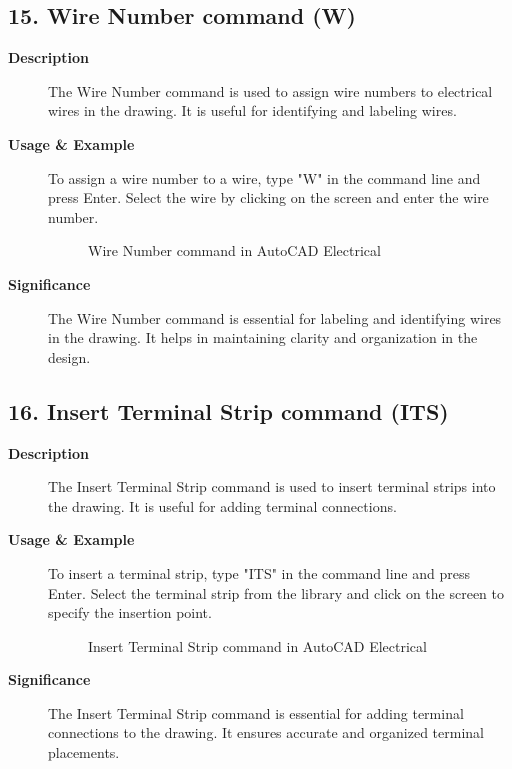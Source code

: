 \documentclass[12pt]{article}
\begin{document}
\subsection*{15. Wire Number command (W)}
\begin{description}
    \item [\textbf{Description}] The Wire Number command is used to assign wire numbers to electrical wires in the drawing. It is useful for identifying and labeling wires.
    \item [\textbf{Usage \& Example}]To assign a wire number to a wire, type "W" in the command line and press Enter. Select the wire by clicking on the screen and enter the wire number.
          \begin{figure}[H]
              \centering
              \caption{Wire Number command in AutoCAD Electrical}
          \end{figure}
    \item [\textbf{Significance}] The Wire Number command is essential for labeling and identifying wires in the drawing. It helps in maintaining clarity and organization in the design.
\end{description}

\subsection*{16. Insert Terminal Strip command (ITS)}
\begin{description}
    \item [\textbf{Description}] The Insert Terminal Strip command is used to insert terminal strips into the drawing. It is useful for adding terminal connections.
    \item [\textbf{Usage \& Example}] To insert a terminal strip, type "ITS" in the command line and press Enter. Select the terminal strip from the library and click on the screen to specify the insertion point.
          \begin{figure}[H]
              \centering
              \caption{Insert Terminal Strip command in AutoCAD Electrical}
          \end{figure}
    \item [\textbf{Significance}] The Insert Terminal Strip command is essential for adding terminal connections to the drawing. It ensures accurate and organized terminal placements.
\end{description}
\end{document}
